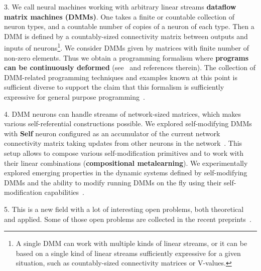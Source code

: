 \documentclass{article}
\begin{document}
3. We call neural machines working with arbitrary linear streams {\bf dataflow matrix machines (DMMs)}. One takes a finite or countable collection of neuron types, and a countable number of copies of a neuron of each type. Then a DMM is defined by
a countably-sized connectivity matrix between outputs and inputs of neurons\footnote{A single DMM can work with multiple kinds of linear streams, or it can be based on a
single kind of linear streams sufficiently expressive for a given situation, such as countably-sized connectivity matrices or
V-values.}. We consider DMMs given by matrices with finite number of non-zero elements. Thus we obtain a programming
formalism where {\bf programs can be continuously deformed} (see~\cite{BukatinAnthony} and references therein). The collection
of DMM-related programming techniques and examples known at this point is sufficient diverse to support the claim that
this formalism is sufficiently expressive for general purpose programming~\cite{BukatinOverview}. 

4. DMM neurons can handle streams of network-sized matrices, which makes various self-referential constructions possible.
We explored self-modifying DMMs with {\bf Self} neuron configured as an accumulator of the current network connectivity matrix taking updates from other neurons in the network~\cite{BukatinAnthony}. This setup allows to compose various
self-modification primitives and to work with their linear combinations ({\bf compositional metalearning}). We
experimentally explored emerging properties in the dynamic systems defined by self-modifying DMMs and
the ability to modify running DMMs on the fly using their self-modification capabilities~\cite{DMM2018}.

5. This is a new field with a lot of interesting open problems, both theoretical and applied. Some of those open problems
are collected in the recent preprints~\cite{BukatinDec2019, BukatinJan2020}.

\small
\end{document}
